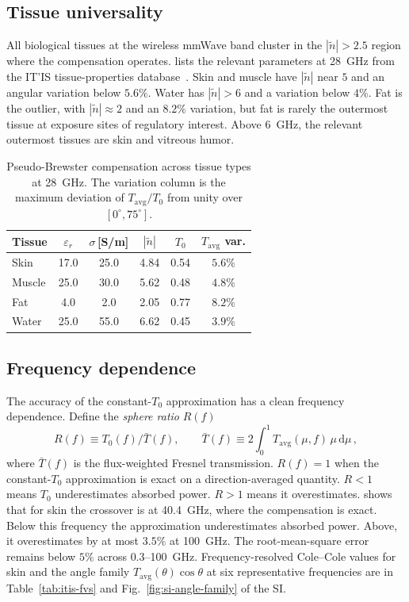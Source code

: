 \documentclass[journal,twocolumn,10pt]{IEEEtran}
\theoremstyle{plain}
\newcommand{\Tavg}{T_{\mathrm{avg}}}
\newcommand{\Tbar}{\bar{T}}
\newcommand{\ntilde}{\tilde{n}}
\newcommand{\diff}{\mathrm{d}}
\begin{document}
\subsection{Tissue universality}\label{subsec:pB-tissues}

All biological tissues at the wireless mmWave band cluster in the
$|\ntilde| > 2.5$ region where the compensation operates.
 lists the relevant parameters at 28~GHz from
the IT'IS tissue-properties database~\cite{ITISv5,Gabriel1996}. Skin and
muscle have $|\ntilde|$ near $5$ and an angular variation below
$5.6\%$. Water has $|\ntilde| > 6$ and a variation below $4\%$.
Fat is the outlier, with $|\ntilde| \approx 2$ and an $8.2\%$
variation, but fat is rarely the outermost tissue at exposure sites
of regulatory interest. Above $6$~GHz, the relevant outermost
tissues are skin and vitreous humor.

\begin{table}[!t]
\centering
\caption{Pseudo-Brewster compensation across tissue types at
28~GHz. The variation column is the maximum deviation of
$\Tavg/T_0$ from unity over $[0^\circ, 75^\circ]$.}
\label{tab:materials}
\begin{tabular}{lccccc}
\toprule
Tissue & $\varepsilon_r$ & $\sigma$\,[S/m] & $|\ntilde|$ & $T_0$
  & $\Tavg$ var. \\
\midrule
Skin   & 17.0 & 25.0 & 4.84 & 0.54 & $5.6\%$ \\
Muscle & 25.0 & 30.0 & 5.62 & 0.48 & $4.8\%$ \\
Fat    &  4.0 &  2.0 & 2.05 & 0.77 & $8.2\%$ \\
Water  & 25.0 & 55.0 & 6.62 & 0.45 & $3.9\%$ \\
\bottomrule
\end{tabular}
\end{table}

\subsection{Frequency dependence}\label{subsec:pB-freq}

The accuracy of the constant-$T_0$ approximation has a clean
frequency dependence. Define the \emph{sphere ratio} $R(f)$
\begin{equation}\label{eq:R-of-f}
  R(f) \equiv T_0(f) / \Tbar(f),
  \qquad
  \Tbar(f) \equiv 2\int_0^1 \Tavg(\mu, f)\,\mu\,\diff\mu\,,
\end{equation}
where $\Tbar(f)$ is the flux-weighted Fresnel transmission. $R(f) =
1$ when the constant-$T_0$ approximation is exact on a
direction-averaged quantity. $R < 1$ means $T_0$ underestimates
absorbed power. $R > 1$ means it overestimates. 
shows that for skin the crossover is at 40.4~GHz, where the
compensation is exact. Below this
frequency the approximation underestimates absorbed power. Above, it
overestimates by at most $3.5\%$ at 100~GHz. The root-mean-square error
remains below $5\%$ across $0.3$--100~GHz. Frequency-resolved
Cole--Cole values for skin and the angle family
$\Tavg(\theta)\cos\theta$ at six representative frequencies are in
Table~\ref{tab:itis-fvs} and Fig.~\ref{fig:si-angle-family} of the SI.
\end{document}
